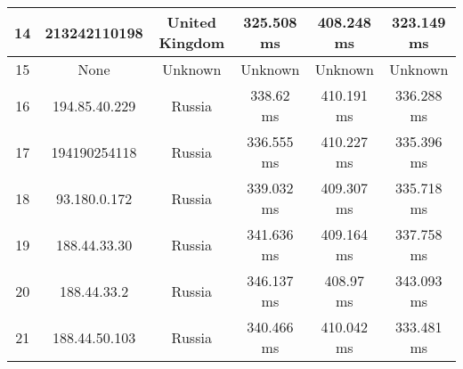 \begin{table}[]
\begin{tabular}{ | c | c | c | c | c | c | }
14	&213242110198	  & United Kingdom   	    & 325.508 ms     	     &408.248 ms     	     &323.149 ms     \\ \hline
15	&None           &     	      Unknown    &   	      Unknown     &  	      Unknown     &  	      Unknown   \\ \hline    
16	&194.85.40.229  &     	       Russia    &   	      338.62 ms   &  	     410.191 ms   &  	     336.288 ms \\ \hline    
17	&194190254118	  &     Russia       	    & 336.555 ms     	     &410.227 ms     	     &335.396 ms     \\ \hline
18	&93.180.0.172   &     	       Russia    &   	     339.032 ms   &  	     409.307 ms   &  	     335.718 ms \\ \hline    
19	&188.44.33.30   &     	       Russia    &   	     341.636 ms   &  	     409.164 ms   &  	     337.758 ms \\ \hline    
20	&188.44.33.2    &     	       Russia    &   	     346.137 ms   &  	      408.97 ms   &  	     343.093 ms \\ \hline    
21	&188.44.50.103  &     	       Russia    &   	     340.466 ms   &  	     410.042 ms   &  	     333.481 ms \\ \hline     

\end{tabular}
\end{table}